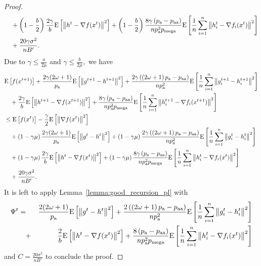 \documentclass{article}
\newcommand*{\probavailable}{\ensuremath{p_{\textnormal{a}}}}
\newcommand*{\probpairaa}{\ensuremath{p_{\textnormal{aa}}}}
\newcommand*{\probmega}{\ensuremath{p_{\text{mega}}}}
\begin{document}
\begin{proof}
\begin{align*}
    &\quad + \left(1 - \frac{b}{2}\right)\frac{2\gamma}{b} \Exp{\norm{h^{t} - \nabla f(x^{t})}^2} + \left(1 - \frac{b}{2}\right)\frac{8 \gamma \left(\probavailable - \probpairaa\right)}{n \probavailable^2 \probmega}\Exp{\frac{1}{n}\sum_{i=1}^n\norm{h^{t}_i - \nabla f_i(x^{t})}^2} \\
    &\quad + \frac{20 \gamma \sigma^2}{n B'}.
  \end{align*}
  Due to $\gamma \leq \frac{a}{2\mu}$ and $\gamma \leq \frac{b}{2\mu},$ we have
  \begin{align*}
    &\Exp{f(x^{t + 1})} + \frac{2\gamma(2\omega + 1)}{\probavailable} \Exp{\norm{g^{t+1} - h^{t+1}}^2} + \frac{2\gamma\left(\left(2 \omega + 1\right)\probavailable - \probpairaa\right)}{n \probavailable^2} \Exp{\frac{1}{n}\sum_{i=1}^n\norm{g^{t+1}_i - h^{t+1}_i}^2}\\
    &\quad  + \frac{2\gamma}{b} \Exp{\norm{h^{t+1} - \nabla f(x^{t+1})}^2} + \frac{8 \gamma \left(\probavailable - \probpairaa\right)}{n \probavailable^2 \probmega} \Exp{\frac{1}{n}\sum_{i=1}^n\norm{h^{t+1}_i - \nabla f_i(x^{t+1})}^2}\\
    &\leq \Exp{f(x^t)} - \frac{\gamma}{2}\Exp{\norm{\nabla f(x^t)}^2} \\
    &\quad + \left(1 - \gamma \mu\right)\frac{2\gamma(2\omega + 1)}{\probavailable} \Exp{\norm{g^{t} - h^{t}}^2} + \left(1 - \gamma \mu\right)\frac{2\gamma\left(\left(2 \omega + 1\right)\probavailable - \probpairaa\right)}{n \probavailable^2}\Exp{\frac{1}{n}\sum_{i=1}^n\norm{g^{t}_i - h^{t}_i}^2} \\
    &\quad + \left(1 - \gamma \mu\right)\frac{2\gamma}{b} \Exp{\norm{h^{t} - \nabla f(x^{t})}^2} + \left(1 - \gamma \mu\right)\frac{8 \gamma \left(\probavailable - \probpairaa\right)}{n \probavailable^2 \probmega}\Exp{\frac{1}{n}\sum_{i=1}^n\norm{h^{t}_i - \nabla f_i(x^{t})}^2} \\
    &\quad + \frac{20 \gamma \sigma^2}{n B'}.
  \end{align*}
  It is left to apply Lemma~\ref{lemma:good_recursion_pl} with 
    \begin{eqnarray*}
      \Psi^t &=& \frac{2(2\omega + 1)}{\probavailable} \Exp{\norm{g^{t} - h^{t}}^2} + \frac{2\left(\left(2 \omega + 1\right)\probavailable - \probpairaa\right)}{n \probavailable^2}\Exp{\frac{1}{n}\sum_{i=1}^n\norm{g^{t}_i - h^{t}_i}^2} \\
      &\quad +& \frac{2}{b} \Exp{\norm{h^{t} - \nabla f(x^{t})}^2} + \frac{8 \left(\probavailable - \probpairaa\right)}{n \probavailable^2 \probmega}\Exp{\frac{1}{n}\sum_{i=1}^n\norm{h^{t}_i - \nabla f_i(x^{t})}^2}
    \end{eqnarray*}
    and $C = \frac{20 \sigma^2}{n B'}$
    to conclude the proof.
\end{proof}
\end{document}
